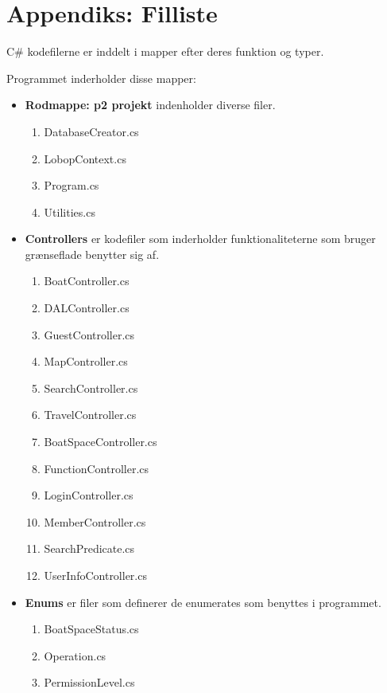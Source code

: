\chapter{Appendiks: Filliste}
\label{cha:filliste}

C\# kodefilerne er inddelt i mapper efter deres funktion og typer.

Programmet inderholder disse mapper:

\begin{itemize}
	\item \textbf{Rodmappe: p2 projekt} indenholder diverse filer.
		\begin{enumerate}
			\item DatabaseCreator.cs
			\item LobopContext.cs
			\item Program.cs
			\item Utilities.cs
		\end{enumerate}	
\end{itemize}

\begin{itemize}
	\item \textbf{Controllers} er kodefiler som inderholder funktionaliteterne som bruger grænseflade benytter sig af. 
		\begin{enumerate}
			\item BoatController.cs
			\item DALController.cs
			\item GuestController.cs
			\item MapController.cs
			\item SearchController.cs
			\item TravelController.cs
			\item BoatSpaceController.cs
			\item FunctionController.cs
			\item LoginController.cs
			\item MemberController.cs
			\item SearchPredicate.cs
			\item UserInfoController.cs
		\end{enumerate}	
\end{itemize}


\begin{itemize}
	\item \textbf{Enums} er filer som definerer de enumerates som benyttes i programmet.
		\begin{enumerate}
			\item BoatSpaceStatus.cs
			\item Operation.cs
			\item PermissionLevel.cs
		\end{enumerate}
\end{itemize}

